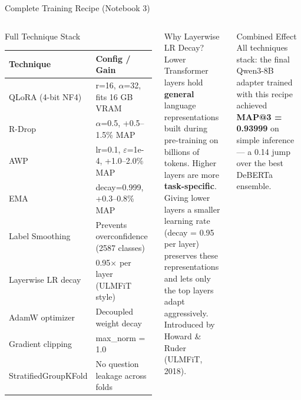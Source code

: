 \documentclass[aspectratio=169]{beamer}
\begin{document}
\begin{frame}{Complete Training Recipe (Notebook 3)}
\begin{columns}[T]
\begin{block}{Full Technique Stack}
\footnotesize
\setlength{\tabcolsep}{4pt}
\renewcommand{\arraystretch}{1.2}
\begin{tabular}{p{2.6cm}p{4.0cm}}
\toprule
\textbf{Technique} & \textbf{Config / Gain}\\
\midrule
QLoRA (4-bit NF4) & r=16, $\alpha$=32, fits 16 GB VRAM\\
R-Drop & $\alpha$=0.5, +0.5--1.5\% MAP\\
AWP & lr=0.1, $\varepsilon$=1e-4, +1.0--2.0\% MAP\\
EMA & decay=0.999, +0.3--0.8\% MAP\\
Label Smoothing & Prevents overconfidence (2587 classes)\\
Layerwise LR decay & 0.95$\times$ per layer (ULMFiT style)\\
AdamW optimizer & Decoupled weight decay\\
Gradient clipping & max\_norm = 1.0\\
StratifiedGroupKFold & No question leakage across folds\\
\bottomrule
\end{tabular}
\end{block}
\begin{block}{Why Layerwise LR Decay?}
Lower Transformer layers hold \textbf{general} language representations built during pre-training on billions of tokens. Higher layers are more \textbf{task-specific}.\\[6pt]
Giving lower layers a smaller learning rate (decay = 0.95 per layer) preserves these representations and lets only the top layers adapt aggressively.\\[6pt]
Introduced by Howard \& Ruder (ULMFiT, 2018).
\end{block}
\vspace{8pt}
\begin{exampleblock}{Combined Effect}
All techniques stack: the final Qwen3-8B adapter trained with this recipe achieved \textbf{MAP@3 = 0.93999} on simple inference --- a 0.14 jump over the best DeBERTa ensemble.
\end{exampleblock}
\end{columns}
\end{frame}
\end{document}

